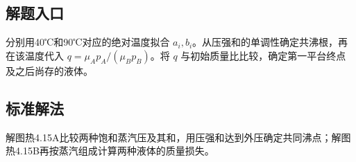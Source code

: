\documentclass[UTF8,fontset=fandol,a4paper,11pt]{ctexart}
\begin{document}


\subsection*{解题入口}

分别用40℃和90℃对应的绝对温度拟合 $a_i,b_i$。从压强和的单调性确定共沸根，再在该温度代入 $q=\mu_Ap_A/(\mu_Bp_B)$。将 $q$ 与初始质量比比较，确定第一平台终点及之后尚存的液体。




\subsection*{标准解法}

解图热4.15A比较两种饱和蒸汽压及其和，用压强和达到外压确定共同沸点；解图热4.15B再按蒸汽组成计算两种液体的质量损失。
\end{document}
